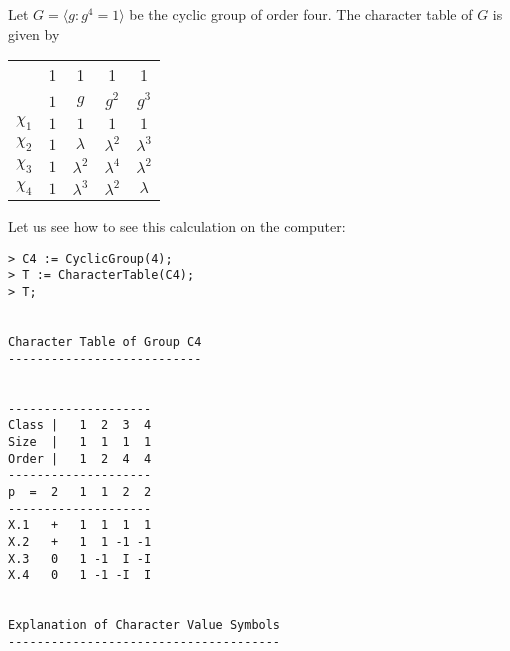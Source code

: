\begin{example}
	Let $G=\langle g:g^4=1\rangle$ 
	be the cyclic group of order four. The character table of $G$ is given by
	\begin{center}
		\begin{tabular}{|c|cccc|}
			\hline 
			& 1 & 1 & 1 & 1\tabularnewline
			& $1$ & $g$ & $g^2$ & $g^{3}$\tabularnewline
			\hline 
			$\chi_{1}$ & $1$ & $1$ & $1$ & $1$\tabularnewline
			$\chi_{2}$ & $1$ & $\lambda$ & $\lambda^2$ & $\lambda^{3}$\tabularnewline
			$\chi_{3}$ & $1$ & $\lambda^2$ & $\lambda^4$ & $\lambda^{2}$\tabularnewline
			$\chi_{4}$ & $1$ & $\lambda^{3}$ & $\lambda^{2}$ & $\lambda$\tabularnewline
			\hline
		\end{tabular}
	\end{center}
 Let us see how to see this calculation on the computer:




\begin{lstlisting}
> C4 := CyclicGroup(4);
> T := CharacterTable(C4);
> T;


Character Table of Group C4
---------------------------


--------------------
Class |   1  2  3  4
Size  |   1  1  1  1
Order |   1  2  4  4
--------------------
p  =  2   1  1  2  2
--------------------
X.1   +   1  1  1  1
X.2   +   1  1 -1 -1
X.3   0   1 -1  I -I
X.4   0   1 -1 -I  I


Explanation of Character Value Symbols
--------------------------------------


\end{lstlisting}
\end{example}
